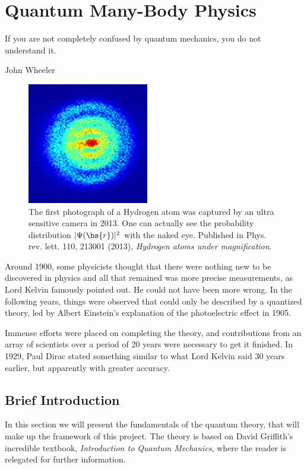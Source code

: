 \chapter{Quantum Many-Body Physics} \label{chp:quantum}
\epigraph{If you are not completely confused by quantum mechanics, you do not understand it.}{John Wheeler}
\begin{figure}[H]
	\centering
	\captionsetup[subfigure]{labelformat=empty}
	\includegraphics[scale=3.0]{Images/art_quantum.jpg}
	\caption{The first photograph of a Hydrogen atom was captured by an ultra sensitive camera in 2013. One can actually see the probability distribution $|\Psi(\bs{r})|^2$ with the naked eye. Published in Phys. rev. lett. 110, 213001 (2013), \textit{Hydrogen atoms under magnification}. \cite{stodolna_hydrogen_2013}}
\end{figure}
Around 1900, some physicists thought that there were nothing new to be discovered in physics and all that remained was more precise measurements, as Lord Kelvin famously pointed out. \cite{weisstein_kelvin_2007} He could not have been more wrong. In the following years, things were observed that could only be described by a quantized theory, led by Albert Einstein's explanation of the photoelectric effect in 1905. 

Immense efforts were placed on completing the theory, and contributions from an array of scientists over a period of 20 years were necessary to get it finished. In 1929, Paul Dirac stated something similar to what Lord Kelvin said 30 years earlier, but apparently with greater accuracy. 

\newpage
\section{Brief Introduction} \label{subsec:elementary}
In this section we will present the fundamentals of the quantum theory, that will make up the framework of this project. The theory is based on David Griffith's incredible textbook, \textit{Introduction to Quantum Mechanics}, where the reader is relegated for further information.


